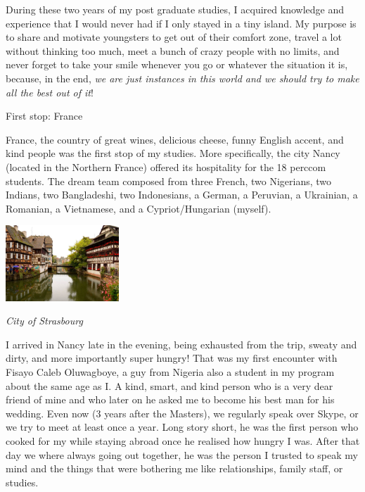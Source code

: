 \documentclass[10pt,a4paper]{article} %
\newcommand{\NewsItem}[1]{ %
\usefont{T1}{fvs}{n}{n} %
\vspace{24pt}\large #1\vspace{3pt} %
\par \normalsize \normalfont}
\begin{document}
\begin{multicols}{3}
During these two years of my post graduate studies, I acquired knowledge and 
experience that I would never had if I only stayed in a tiny island. 
My purpose is to share and motivate youngsters to get out of their comfort zone, 
travel a lot without thinking too much, meet a bunch of crazy people with no limits, 
and never forget to take your smile whenever you go or whatever the situation it is, 
because, in the end, \textit{we are just instances in this world and we 
should try to make all the best out of it}!


\NewsItem{First stop: France}

France, the country of great wines, delicious cheese, funny English accent, 
and kind people was the first stop of my studies. 
More specifically, the city Nancy (located in the Northern France) offered its hospitality 
for the 18 {\sc perccom} students. 
The dream team composed from three French, two Nigerians, two Indians, two Bangladeshi, two 
Indonesians, a German, a Peruvian, a Ukrainian, a Romanian, a Vietnamese, and a 
Cypriot/Hungarian (myself).  


\begin{center}
	\includegraphics[width=0.32\textwidth]{media/strasbourg.jpg}
	\par\textit{City of Strasbourg}
\end{center} 

I arrived in Nancy late in the evening, being exhausted from the trip, sweaty and 
dirty, and more importantly super hungry! 
That was my first encounter with Fisayo Caleb Oluwagboye, a guy from Nigeria also 
a student in my program about the same age as I. 
A kind, smart, and kind person who is a very dear friend of mine 
and who later on he asked me to become his best man for his wedding.    
Even now (3 years after the Masters), we regularly speak over Skype, or we try to 
meet at least once a year. 
Long story short, he was the first person who cooked for my while staying abroad 
once he realised how hungry I was. 
After that day we where always going out together, he was the person I trusted to 
speak my mind and the things that were bothering me like relationships, family staff, 
or studies. 



\end{multicols}
\end{document}

